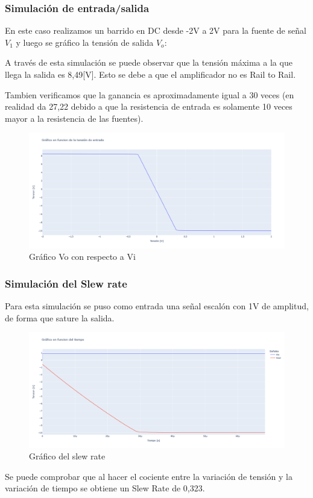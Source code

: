 \subsubsection{Simulación de entrada/salida}

En este caso realizamos un barrido en DC desde -2V a 2V para la fuente de señal $V_1$ y luego se gráfico la tensión de salida $V_o$:

A través de esta simulación se puede observar que la tensión máxima a la que llega la salida es 8,49[V]. Esto se debe a que el amplificador no es Rail to Rail. 

Tambien verificamos que la ganancia es aproximadamente igual a 30 veces (en realidad da 27,22 debido a que la resistencia de entrada es solamente 10 veces mayor a la resistencia de las fuentes).

\newpage

\begin{figure}[h!]
    \centering
    \includegraphics[width=1.0\linewidth]{img/Lab2_1b_Salida_Entrada.png}
    \caption{Gráfico Vo con respecto a Vi}
    \label{fig:vo_vi}
\end{figure}

\vspace{1em}

\subsubsection{Simulación del Slew rate }

Para esta simulación se puso como entrada una señal escalón con 1V de amplitud, de forma que sature la salida. 

\begin{figure}[h!]
    \centering
    \includegraphics[width=0.90\linewidth]{img/Lab2_1b_SlewRate.png}
    \caption{Gráfico del slew rate}
    \label{fig:slew_rate}
\end{figure}
Se puede comprobar que al hacer el cociente entre la variación de tensión y la variación de tiempo se obtiene un Slew Rate de 0,323.
